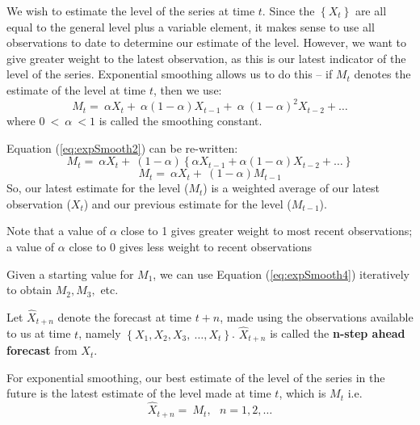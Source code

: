 \documentclass[12pt,a4paper,openany,twoside]{report}
\theoremstyle{definition}
\theoremstyle{remark}
\theoremstyle{plain}
\theoremstyle{definition}
\theoremstyle{definition}
\theoremstyle{definition}
\theoremstyle{remark}
\begin{document}
We wish to estimate the level of the series at time \(t\). Since the
\(\left\{ X_{t} \right\}\) are all equal to the general level plus a
variable element, it makes sense to use all observations to date to
determine our estimate of the level. However, we want to give greater
weight to the latest observation, as this is our latest indicator of the
level of the series. Exponential smoothing allows us to do this -- if
\(M_{t}\) denotes the estimate of the level at time \(t\), then we use:
\begin{equation}
M_{t} = \ \alpha X_{t} + \ \alpha\left( 1 - \alpha \right)X_{t - 1} + \ \alpha\ {(1 - \alpha)}^{2}X_{t - 2} + \ldots
\label{eq:expSmooth2}
\end{equation}
where \(0\  < \ \alpha\  < 1\) is called the smoothing constant.

Equation (\ref{eq:expSmooth2}) can be re-written:
\begin{equation}
M_{t} = \ \alpha X_{t} + \ \left( 1 - \alpha \right)\left\{ \alpha X_{t - 1} + \alpha(1 - \alpha)X_{t - 2} + \ldots \right\}
\label{eq:expSmooth3}
\end{equation}
\begin{equation}
M_{t} = \ \alpha X_{t} + \ \left( 1 - \alpha \right)M_{t - 1}
\label{eq:expSmooth4}
\end{equation}
So, our latest estimate for the level (\(M_{t}\)) is a weighted average
of our latest observation (\(X_{t}\)) and our previous estimate for the
level (\(M_{t - 1}\)).

Note that a value of \(\alpha\) close to 1 gives greater weight to most
recent observations; a value of \(\alpha\) close to 0 gives less weight
to recent observations

Given a starting value for \(M_{1}\), we can use Equation (\ref{eq:expSmooth4})
iteratively to obtain \(M_{2}, M_{3},\) etc.

Let \({\hat{X}}_{t + n}\) denote the forecast at time \(t + n\), made
using the observations available to us at time \(t\), namely
\(\left\{ X_{1},X_{2},X_{3},\ \ldots,X_{t} \right\}\).
\({\hat{X}}_{t + n}\) is called the \textbf{n-step ahead forecast} from
\(X_{t}\).

For exponential smoothing, our best estimate of the level of the series
in the future is the latest estimate of the level made at time \(t\),
which is \(M_{t}\) i.e.
\begin{equation}
{\hat{X}}_{t + n} = \ M_{t},\ \ \ n = 1,2,\ldots
\label{eq:expSmooth5}
\end{equation}
\end{document}
